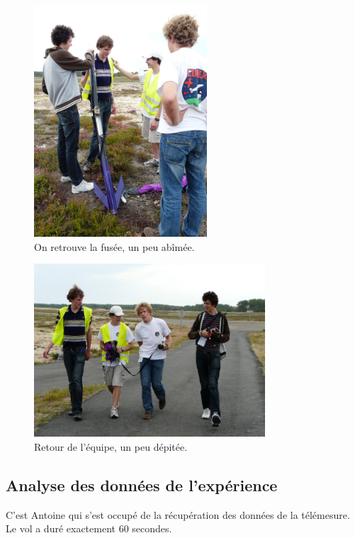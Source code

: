 \documentclass[a4paper,12pt]{scrartcl}
\begin{document}
      	      \begin{figure}[H]
		    \begin{center}
		      \caption{On retrouve la fusée, un peu abîmée.}
		      \includegraphics[height=326px, width=244px]{Photos_Mercury/resultat-vol.jpg}
		    \end{center}
	      \end{figure}
   	      \begin{figure}[H]
		    \begin{center}
		      \caption{Retour de l'équipe, un peu dépitée.}
		      \includegraphics[height=244px, width=326px]{Photos_Mercury/retour.jpg}
		    \end{center}
	      \end{figure}

	  
	  \subsection{Analyse des données de l'expérience}
	
	  C'est Antoine qui s'est occupé de la récupération des données de la télémesure. Le vol a duré exactement 60 secondes.
\end{document}
